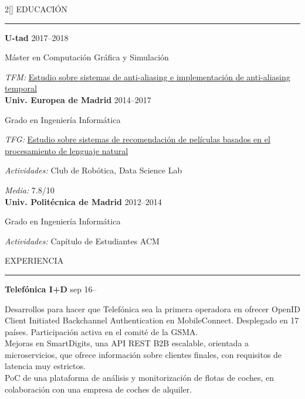 \documentclass[a4paper, 12pt]{article}
\newenvironment{myparacol}[2][]{%
\begin{paracol}{#2}[#1]\setlength{\parindent}{0pt}}{%
\end{paracol}}
\begin{document}
\setlength{\columnsep}{24pt}
\begin{sloppypar}
\begin{myparacol}{2}
    EDUCACIÓN
    \vspace{1mm}
    \hrule
    \kern9pt
    \textbf{U-tad} \hfill 2017--2018

    Máster en Computación Gráfica y Simulación

    \textit{TFM:} \href{https://github.com/hugo19941994/temporal-aa-doc/raw/master/thesis.pdf}{Estudio sobre sistemas de anti-aliasing e implementación de anti-aliasing temporal}\\

    \textbf{Univ. Europea de Madrid} \hfill 2014--2017

    Grado en Ingeniería Informática

    \textit{TFG:} \href{https://github.com/hugo19941994/movie-pepper-doc/raw/master/thesis.pdf}{Estudio sobre sistemas de recomendación de películas basados en el procesamiento de lenguaje natural}

    \textit{Actividades:} Club de Robótica, Data Science Lab

    \textit{Media:} 7.8/10\\

    \textbf{Univ. Politécnica de Madrid} \hfill 2012--2014

    Grado en Ingeniería Informática

    \textit{Actividades:} Capítulo de Estudiantes ACM
    \\

    \switchcolumn{}

    EXPERIENCIA
    \vspace{1mm}
    \hrule
    \kern9pt

    \textbf{Telefónica I+D} \hfill sep 16--

    Desarrollos para hacer que Telefónica sea la primera operadora en ofrecer OpenID Client Initiated Backchannel Authentication en MobileConnect. Desplegado en 17 países. Participación activa en el comité de la GSMA\@.\\

    Mejoras en SmartDigits, una API REST B2B escalable, orientada a microservicios, que ofrece información sobre clientes finales, con requisitos de latencia muy estrictos.\\

    PoC de una plataforma de análisis y monitorización de flotas de coches, en colaboración con una empresa de coches de alquiler.\\


\end{myparacol}
\end{sloppypar}
\end{document}
